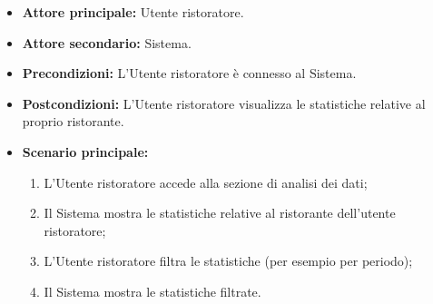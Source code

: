 \label{usecase:Analisi dei dati}
\begin{itemize}
	\item \textbf{Attore principale:} Utente ristoratore.

	\item \textbf{Attore secondario:} Sistema.

	\item \textbf{Precondizioni:}
	      L'Utente ristoratore è connesso al Sistema.

	\item \textbf{Postcondizioni:}
	      L'Utente ristoratore visualizza le statistiche relative al proprio
	      ristorante.

	\item \textbf{Scenario principale:}
	      \begin{enumerate}
		      \item L'Utente ristoratore accede alla sezione di analisi dei
		            dati;

		      \item Il Sistema mostra le statistiche relative al ristorante
		            dell'utente ristoratore;

		      \item L'Utente ristoratore filtra le statistiche (per esempio
		            per periodo);

		      \item Il Sistema mostra le statistiche filtrate.
	      \end{enumerate}
\end{itemize}
